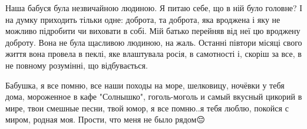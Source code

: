 
Наша бабуся була незвичайною людиною. Я питаю себе, що в ній було головне? І на
думку приходить тільки одне: доброта, та доброта, яка вроджена і яку не можливо
підробити чи виховати в собі. Мій батько перейняв від неї цю вроджену доброту.
Вона не була щасливою людиною, на жаль. Останні півтори місяці свого життя вона
провела в пеклі, яке влаштувала росія,  в самотності і, скоріш за все, в не
повному розумінні, що відбувається.

Бабушка, я все помню, все наши походы на море, шелковицу, ночёвки у тебя дома,
мороженное в кафе "Солнышко", гоголь-моголь и самый вкусный цикорий в мире,
твои смешные песни, твой юмор, я все помню..я тебя люблю, покойся с миром,
родная моя.  Прости, что меня не было рядом😔


